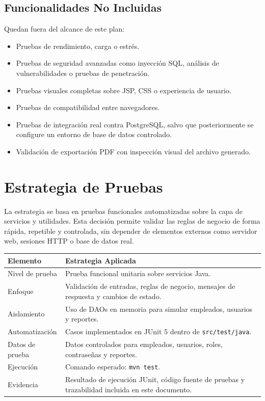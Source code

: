\documentclass[12pt,a4paper]{article}
\begin{document}
\subsection{Funcionalidades No Incluidas}

Quedan fuera del alcance de este plan:

\begin{itemize}[leftmargin=*]
    \item Pruebas de rendimiento, carga o estrés.
    \item Pruebas de seguridad avanzadas como inyección SQL, análisis de vulnerabilidades o pruebas de penetración.
    \item Pruebas visuales completas sobre JSP, CSS o experiencia de usuario.
    \item Pruebas de compatibilidad entre navegadores.
    \item Pruebas de integración real contra PostgreSQL, salvo que posteriormente se configure un entorno de base de datos controlado.
    \item Validación de exportación PDF con inspección visual del archivo generado.
\end{itemize}

\section{Estrategia de Pruebas}

La estrategia se basa en pruebas funcionales automatizadas sobre la capa de servicios y utilidades. Esta decisión permite validar las reglas de negocio de forma rápida, repetible y controlada, sin depender de elementos externos como servidor web, sesiones HTTP o base de datos real.

\begin{longtable}{|p{4cm}|p{10cm}|}
\hline
\rowcolor{grisClaro}
\textbf{Elemento} & \textbf{Estrategia Aplicada} \\
\hline
Nivel de prueba & Prueba funcional unitaria sobre servicios Java. \\
\hline
Enfoque & Validación de entradas, reglas de negocio, mensajes de respuesta y cambios de estado. \\
\hline
Aislamiento & Uso de DAOs en memoria para simular empleados, usuarios y reportes. \\
\hline
Automatización & Casos implementados en JUnit 5 dentro de \texttt{src/test/java}. \\
\hline
Datos de prueba & Datos controlados para empleados, usuarios, roles, contraseñas y reportes. \\
\hline
Ejecución & Comando esperado: \texttt{mvn test}. \\
\hline
Evidencia & Resultado de ejecución JUnit, código fuente de pruebas y trazabilidad incluida en este documento. \\
\hline
\end{longtable}
\end{document}
